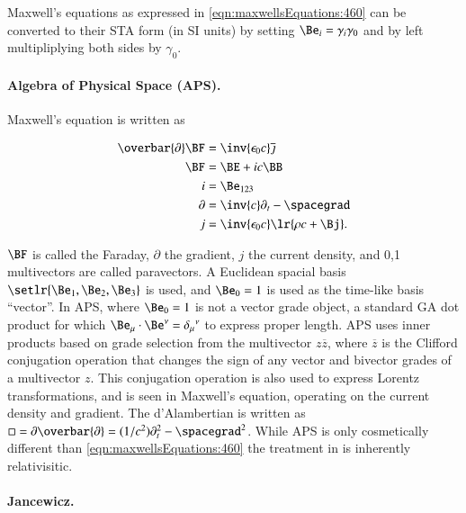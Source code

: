 Maxwell's equations as expressed in \cref{eqn:maxwellsEquations:460} can be converted to their STA form (in SI units) by setting \( \Be_i = \gamma_i \gamma_0 \) and by left multipliplying both sides by \( \gamma_0 \).

\paragraph{Algebra of Physical Space (APS).  \citep{baylis2004electrodynamics}}
Maxwell's equation is written as

\begin{dmath}\label{eqn:galiterature:40}
\begin{aligned}
\overbar{\partial} \BF &= \inv{\epsilon_0 c} \overline{\jmath} \\
\BF &= \BE + i c \BB \\
i &= \Be_{123} \\
\partial &= \inv{c} \partial_t - \spacegrad \\
j &= \inv{\epsilon_0 c} \lr{ \rho c + \Bj }.
\end{aligned}
\end{dmath}

\( \BF \) is called the Faraday, \( \partial \) the gradient, \( j \) the current density, and
0,1 multivectors are called paravectors.
A Euclidean spacial basis \( \setlr{ \Be_1, \Be_2, \Be_3 } \) is used, and \( \Be_0 = 1 \) is used as the time-like basis ``vector''.
In APS, where \( \Be_0 = 1 \) is not a vector grade object, a standard GA dot product for which \( \Be_\mu \cdot \Be^\nu = {\delta_\mu}^\nu \)
to express proper length.
APS uses inner products based on grade selection from the multivector \( z \overbar{z} \), where
\( \overbar{z} \) is the Clifford conjugation operation
that changes the sign of any vector and bivector grades of a multivector \( z \).
This conjugation operation is also used to express Lorentz transformations, and is seen in Maxwell's equation, operating on the current density and gradient.
The d'Alambertian is written as \( \Box = \partial \overbar{\partial} = (1/c^2) \partial_t^2 - \spacegrad^2 \).
While APS is only cosmetically different than \cref{eqn:maxwellsEquations:460} the treatment in \citep{baylis2004electrodynamics} is inherently relativisitic.

\paragraph{Jancewicz.  \citep{jancewicz1988multivectors}}

